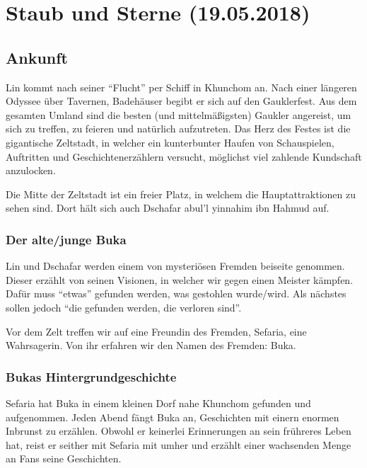 \hypertarget{staub-und-sterne-19.05.2018}{%
\section{Staub und Sterne
(19.05.2018)}\label{staub-und-sterne-19.05.2018}}

\hypertarget{ankunft}{%
\subsection{Ankunft}\label{ankunft}}

Lin kommt nach seiner ``Flucht'' per Schiff in Khunchom an. Nach einer
längeren Odyssee über Tavernen, Badehäuser begibt er sich auf den
Gauklerfest. Aus dem gesamten Umland sind die besten (und
mittelmäßigsten) Gaukler angereist, um sich zu treffen, zu feieren und
natürlich aufzutreten. Das Herz des Festes ist die gigantische
Zeltstadt, in welcher ein kunterbunter Haufen von Schauspielen,
Auftritten und Geschichtenerzählern versucht, möglichst viel zahlende
Kundschaft anzulocken.

Die Mitte der Zeltstadt ist ein freier Platz, in welchem die
Hauptattraktionen zu sehen sind. Dort hält sich auch Dschafar abul'l
yinnahim ibn Hahmud auf.

\hypertarget{der-altejunge-buka}{%
\subsubsection{Der alte/junge Buka}\label{der-altejunge-buka}}

Lin und Dschafar werden einem von mysteriösen Fremden beiseite genommen.
Dieser erzählt von seinen Visionen, in welcher wir gegen einen Meister
kämpfen. Dafür muss ``etwas'' gefunden werden, was gestohlen wurde/wird.
Als nächstes sollen jedoch ``die gefunden werden, die verloren sind''.

Vor dem Zelt treffen wir auf eine Freundin des Fremden, Sefaria, eine
Wahrsagerin. Von ihr erfahren wir den Namen des Fremden: Buka.

\hypertarget{bukas-hintergrundgeschichte}{%
\subsubsection{Bukas
Hintergrundgeschichte}\label{bukas-hintergrundgeschichte}}

Sefaria hat Buka in einem kleinen Dorf nahe Khunchom gefunden und
aufgenommen. Jeden Abend fängt Buka an, Geschichten mit einern enormen
Inbrunst zu erzählen. Obwohl er keinerlei Erinnerungen an sein frühreres
Leben hat, reist er seither mit Sefaria mit umher und erzählt einer
wachsenden Menge an Fans seine Geschichten.

